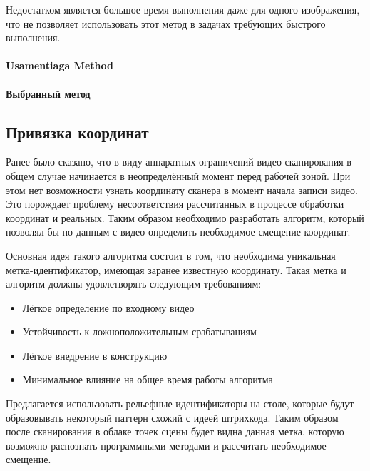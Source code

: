                 Недостатком является большое время выполнения даже для одного изображения, что не позволяет использовать этот метод в задачах требующих быстрого выполнения.
            
            \paragraph{Usamentiaga Method}\cite{Usamentiaga2012}
                
            
            \paragraph{Выбранный метод}
            
        \subsection{Привязка координат}
            Ранее было сказано, что в виду аппаратных ограничений видео сканирования в общем случае начинается в неопределённый момент перед рабочей зоной. При этом нет возможности узнать координату сканера в момент начала записи видео. Это порождает проблему несоответствия рассчитанных в процессе обработки координат и реальных. Таким образом необходимо разработать алгоритм, который позволял бы по данным с видео определить необходимое смещение координат.
            
            Основная идея такого алгоритма состоит в том, что необходима уникальная метка-идентификатор, имеющая заранее известную координату. Такая метка и алгоритм должны удовлетворять следующим требованиям:
            \begin{itemize}
                \item Лёгкое определение по входному видео
                \item Устойчивость к ложноположительным срабатываниям
                \item Лёгкое внедрение в конструкцию
                \item Минимальное влияние на общее время работы алгоритма
            \end{itemize}

            Предлагается использовать рельефные идентификаторы на столе, которые будут образовывать некоторый паттерн схожий с идеей штрихкода. Таким образом после сканирования в облаке точек сцены будет видна данная метка, которую возможно распознать программными методами и рассчитать необходимое смещение.
            
